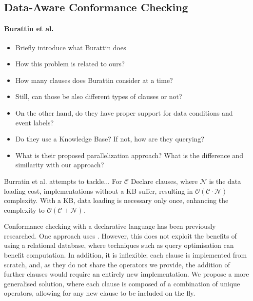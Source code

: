 \subsection{Data-Aware Conformance Checking}

\paragraph*{Burattin et al.} \cite{BurattinMS16}
\begin{itemize}
	\item{Briefly introduce what Burattin does}
	\item{How this problem is related to ours?}
	\item{How many clauses does Burattin consider at a time?}
	\item{Still, can those be also different types of clauses or not?}
	\item{On the other hand, do they have proper support for data conditions and event labels?}
	\item{Do they use a Knowledge Base? If not, how are they querying?}
	\item{What is their proposed parallelization approach? What is the difference and similarity with our approach?}
\end{itemize}
Burratin et al. attempts to tackle... For $\mathcal{C}$ Declare clauses, where $\mathcal{N}$ is the data loading cost, implementations without a KB suffer, resulting in $\mathcal{O(C \cdot N)}$ complexity. With a KB, data loading is necessary only once, enhancing the complexity to $\mathcal{O(C + N)}$.


Conformance checking with a declarative language has been previously researched. One approach uses \LTLf \cite{BurattinMS16}. However, this does not exploit the benefits of using a relational database, where techniques such as query optimisation can benefit computation. In addition, it is inflexible; each clause is implemented from scratch, and, as they do not share the operators we provide, the addition of further clauses would require an entirely new implementation. We propose a more generalised solution, where each clause is composed of a combination of unique operators, allowing for any new clause to be included on the fly. 


